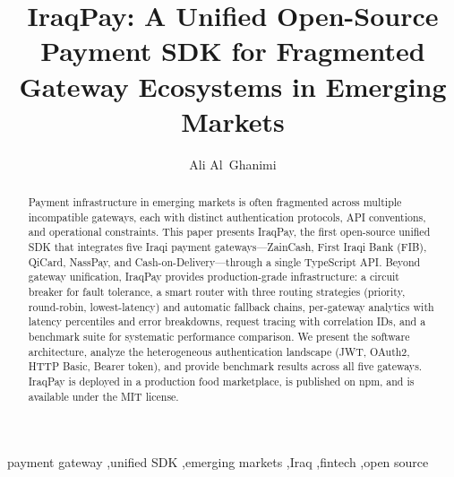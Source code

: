 \documentclass[preprint,12pt]{elsarticle}
\begin{document}
\begin{frontmatter}

\title{IraqPay: A Unified Open-Source Payment SDK for Fragmented Gateway Ecosystems in Emerging Markets}

\author[kufa]{Ali Al~Ghanimi}


\begin{abstract}
Payment infrastructure in emerging markets is often fragmented across multiple incompatible gateways, each with distinct authentication protocols, API conventions, and operational constraints. This paper presents IraqPay, the first open-source unified SDK that integrates five Iraqi payment gateways---ZainCash, First Iraqi Bank (FIB), QiCard, NassPay, and Cash-on-Delivery---through a single TypeScript API. Beyond gateway unification, IraqPay provides production-grade infrastructure: a circuit breaker for fault tolerance, a smart router with three routing strategies (priority, round-robin, lowest-latency) and automatic fallback chains, per-gateway analytics with latency percentiles and error breakdowns, request tracing with correlation IDs, and a benchmark suite for systematic performance comparison. We present the software architecture, analyze the heterogeneous authentication landscape (JWT, OAuth2, HTTP Basic, Bearer token), and provide benchmark results across all five gateways. IraqPay is deployed in a production food marketplace, is published on npm, and is available under the MIT license.
\end{abstract}

\begin{keyword}
payment gateway \sep unified SDK \sep emerging markets \sep Iraq \sep fintech \sep open source
\end{keyword}

\end{frontmatter}

\end{document}
